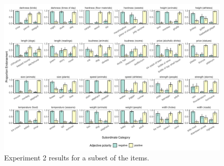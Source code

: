 \documentclass[doc]{apa6}
\begin{document}
\begin{figure}[t!]
\centering
\includegraphics[width=\textwidth]{figs/bars_adj_finalExpt_pilot_byItem.pdf}
\caption{Experiment 2 results for a subset of the items.}\label{fig:adjEndorseItems}
\end{figure}
\end{document}
